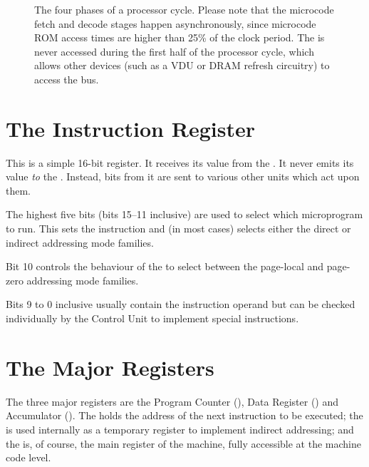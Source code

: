 \begin{figure*}
\centering
{}
\caption[Phases of a processor cycle]{\label{fig:processor-cycle} The
  four phases of a processor cycle. Please note that the microcode
  fetch and decode stages happen asynchronously, since microcode ROM
  access times are higher than 25\% of the clock period. The \DBUS{}
  is never accessed during the first half of the processor cycle,
  which allows other devices (such as a VDU or DRAM refresh circuitry)
  to access the bus.}
\end{figure*}



\section{The Instruction Register}

This is a simple 16-bit register. It receives its value from the
\IBUS. It never emits its value {\em to\/} the \IBUS. Instead, bits
from it are sent to various other units which act upon them.

The highest five bits (bits 15–11 inclusive) are used to select which microprogram to
run. This sets the instruction and (in most cases) selects either the
direct or indirect addressing mode families.

Bit 10 controls the behaviour of the \AGL to select between the
page-local and page-zero addressing mode families.

Bits 9 to 0 inclusive usually contain the instruction operand but can
be checked individually by the Control Unit to implement special
instructions.

\section{The Major Registers}
\label{sec:major-registers}

The three major registers are the Program Counter (\PC), Data Register
(\DR) and Accumulator (\AC). The \PC{} holds the address of the next
instruction to be executed; the \DR{} is used internally as a
temporary register to implement indirect addressing; and the \AC{} is,
of course, the main register of the machine, fully accessible at the
machine code level.

